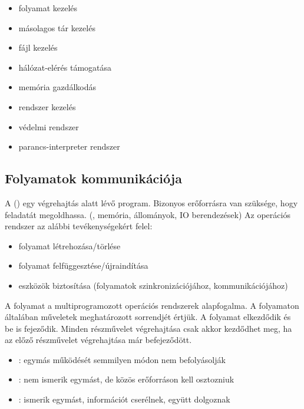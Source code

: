 \documentclass[../main.tex]{subfiles}
\begin{document}
\begin{multicols}{2}
	\begin{itemize}
		\item folyamat kezelés
		\item másolagos tár kezelés
		\item fájl kezelés
		\item hálózat-elérés támogatása
		\item memória gazdálkodás
		\item {} rendszer kezelés
		\item védelmi rendszer
		\item parancs-interpreter rendszer
	\end{itemize}
\end{multicols}

\subsection{Folyamatok kommunikációja}

A  () egy végrehajtás alatt lévő program.
Bizonyos erőforrásra van szüksége, hogy feladatát megoldhassa.
(, memória, állományok, IO berendezések)
Az operációs rendszer az alábbi tevékenységekért felel:
\begin{itemize}
	\item folyamat létrehozása/törlése
	\item folyamat felfüggesztése/újraindítása
	\item eszközök biztosítása
	      (folyamatok szinkronizációjához, kommunikációjához)
\end{itemize}

A folyamat a multiprogramozott operációs rendszerek alapfogalma.
A folyamaton általában műveletek meghatározott sorrendjét értjük.
A folyamat elkezdődik és be is fejeződik.
Minden részművelet végrehajtása csak akkor kezdődhet meg,
ha az előző részművelet végrehajtása már befejeződött.
\begin{itemize}
	\item {}:
	      egymás működését semmilyen módon nem befolyásolják

	\item {}:
	      nem ismerik egymást, de közös erőforráson kell osztozniuk

	\item {}:
	      ismerik egymást, információt cserélnek, együtt dolgoznak
\end{itemize}
\end{document}
